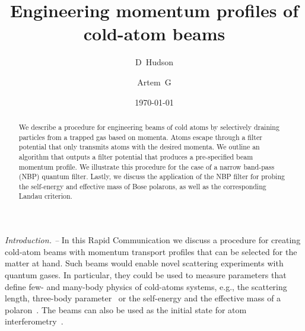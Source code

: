 \documentclass[twocolumn,amsmath,amssymb,showpacs,pra,superscriptaddress,aps]{revtex4-1}
\begin{document}
\title{Engineering momentum profiles of cold-atom beams}

\author{D~Hudson }

\author{Artem~G }


\date{\today}

\begin{abstract}
We describe a procedure for engineering beams of cold atoms by selectively draining particles from a trapped gas based on momenta. Atoms escape through a filter potential that only transmits atoms with the desired momenta. We outline an algorithm that outputs a filter potential that produces a pre-specified beam momentum profile. We illustrate this procedure for the case of a narrow band-pass (NBP) quantum filter. Lastly, we discuss the application of the NBP filter for probing the self-energy and effective mass of Bose polarons, as well as the corresponding Landau criterion.
\end{abstract}


\maketitle



{\it Introduction. --}   
In this Rapid Communication we discuss a procedure for creating cold-atom beams with momentum transport profiles that can be selected for the matter at hand.
Such beams would enable novel scattering experiments with quantum gases. In particular, 
they could be used to measure parameters that define
few- and many-body physics of cold-atoms systems, e.g., the
scattering length, three-body parameter~\cite{braaten2006, bloch2008} or
the self-energy and the effective mass of a polaron~\cite{massignan2014, schmidt2018}.
The beams can also be used as the initial state for atom interferometry~\cite{Impens2006,Cronin2009}.
\end{document}
